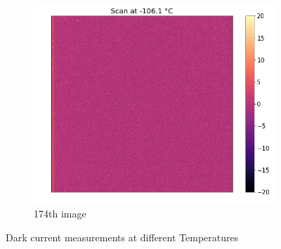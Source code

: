 \begin{figure}[h]
\begin{subfigure}{0.32\textwidth}
	\includegraphics[width=0.95\linewidth]{report_pictures/s173.png}
	\caption{174th image}
	\label{174th}
	\end{subfigure}
	\caption{Dark current measurements at different Temperatures}
	\label{darks}
\end{figure} 


